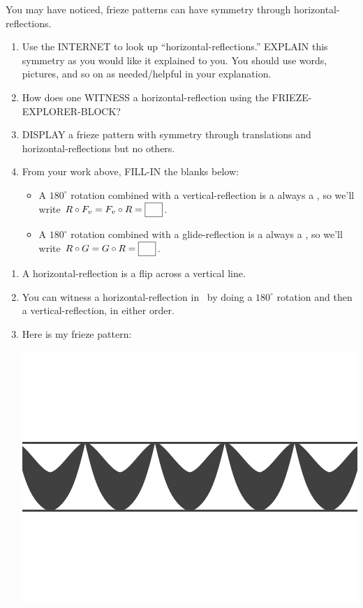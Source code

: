 \documentclass[noauthor,nooutcomes,hints        ]{ximera}
\begin{document}
\begin{question}
  You may have noticed, frieze patterns can have symmetry through
  horizontal-reflections.
  \begin{enumerate}
  \item Use the INTERNET to look up ``horizontal-reflections.''
    EXPLAIN this symmetry as you would like it explained to you. You
    should use words, pictures, and so on as needed/helpful in your
    explanation.
  \item How does one WITNESS a horizontal-reflection using the
    FRIEZE-EXPLORER-BLOCK?
  \item DISPLAY a frieze pattern with symmetry through translations
    and horizontal-reflections but no others.
  \item   From your work above, FILL-IN the blanks below:
  \begin{itemize}
  \item A $180^\circ$ rotation combined with a vertical-reflection
    is a always a \fbox{\phantom{horizontal-reflection}}, so we'll
    write $R\circ F_v = F_v \circ R = \fbox{\phantom{$F_h$}}$.
  \item A $180^\circ$ rotation combined with a glide-reflection
    is a always a \fbox{\phantom{horizontal-reflection}}, so we'll
    write $R\circ G = G \circ R = \fbox{\phantom{$F_h$}}$.
  \end{itemize}
  \end{enumerate}
  \begin{freeResponse}
    \begin{enumerate}
    \item A horizontal-reflection is a flip across a vertical line.
    \item You can witness a horizontal-reflection in \snap\ by doing a
      $180^\circ$ rotation and then a vertical-reflection, in either
      order.
    \item Here is my frieze pattern:
      \begin{center}
        \includegraphics[width=.6\textwidth]{ansFv.png}

\end{center}
\end{enumerate}
\end{freeResponse}
\end{question}
\end{document}
